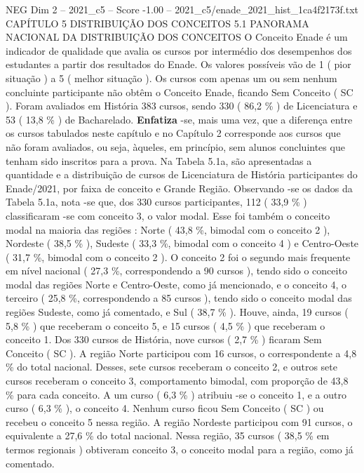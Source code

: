 \begin{textsample}{NEG Dim 2 – 2021\_c5 – Score -1.00 – 2021\_c5/enade\_2021\_hist\_1ca4f2173f.txt}  \label{ex:f2_neg_149}
CAPÍTULO 5 DISTRIBUIÇÃO DOS CONCEITOS 5.1 PANORAMA NACIONAL DA DISTRIBUIÇÃO DOS CONCEITOS O Conceito Enade é um indicador de qualidade que avalia os cursos por intermédio dos desempenhos dos estudantes a partir dos resultados do Enade.
Os valores possíveis vão de 1 ( pior situação ) a 5 ( melhor situação ).
Os cursos com apenas um ou sem nenhum concluinte participante não obtêm o Conceito Enade, ficando Sem Conceito ( SC ).
Foram avaliados em História 383 cursos, sendo 330 ( 86,2 \% ) de Licenciatura e 53 ( 13,8 \% ) de Bacharelado. \textbf{Enfatiza} -se, mais uma vez, que a diferença entre os cursos tabulados neste capítulo e no Capítulo 2 corresponde aos cursos que não foram avaliados, ou seja, àqueles, em princípio, sem alunos concluintes que tenham sido inscritos para a prova.
Na Tabela 5.1a, são apresentadas a quantidade e a distribuição de cursos de Licenciatura de História participantes do Enade/2021, por faixa de conceito e Grande Região.
Observando -se os dados da Tabela 5.1a, nota -se que, dos 330 cursos participantes, 112 ( 33,9 \% ) classificaram -se com conceito 3, o valor modal.
Esse foi também o conceito modal na maioria das regiões : Norte ( 43,8 \%, bimodal com o conceito 2 ), Nordeste ( 38,5 \% ), Sudeste ( 33,3 \%, bimodal com o conceito 4 ) e Centro-Oeste ( 31,7 \%, bimodal com o conceito 2 ).
O conceito 2 foi o segundo mais frequente em nível nacional ( 27,3 \%, correspondendo a 90 cursos ), tendo sido o conceito modal das regiões Norte e Centro-Oeste, como já mencionado, e o conceito 4, o terceiro ( 25,8 \%, correspondendo a 85 cursos ), tendo sido o conceito modal das regiões Sudeste, como já comentado, e Sul ( 38,7 \% ).
Houve, ainda, 19 cursos ( 5,8 \% ) que receberam o conceito 5, e 15 cursos ( 4,5 \% ) que receberam o conceito 1.
Dos 330 cursos de História, nove cursos ( 2,7 \% ) ficaram Sem Conceito ( SC ).
A região Norte participou com 16 cursos, o correspondente a 4,8 \% do total nacional.
Desses, sete cursos receberam o conceito 2, e outros sete cursos receberam o conceito 3, comportamento bimodal, com proporção de 43,8 \% para cada conceito.
A um curso ( 6,3 \% ) atribuiu -se o conceito 1, e a outro curso ( 6,3 \% ), o conceito 4.
Nenhum curso ficou Sem Conceito ( SC ) ou recebeu o conceito 5 nessa região.
A região Nordeste participou com 91 cursos, o equivalente a 27,6 \% do total nacional.
Nessa região, 35 cursos ( 38,5 \% em termos regionais ) obtiveram conceito 3, o conceito modal para a região, como já comentado.

\end{textsample}
